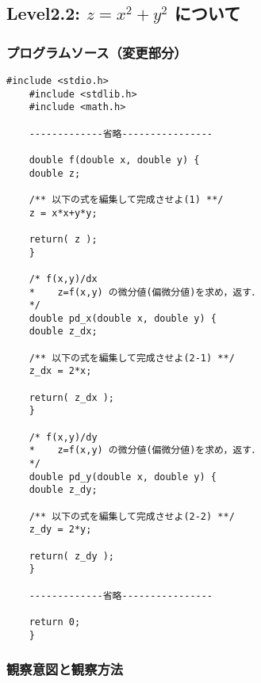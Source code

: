 \subsection{Level2.2: $z=x^2 + y^2$ について}
\subsubsection{プログラムソース（変更部分）}

	\begin{lstlisting}[caption=探索プログラム,label=ラベル]
	#include <stdio.h>
	#include <stdlib.h>
	#include <math.h>

	-------------省略----------------

	double f(double x, double y) {
  	double z;

  	/** 以下の式を編集して完成させよ(1) **/
  	z = x*x+y*y;

  	return( z );
	}

	/* f(x,y)/dx
 	*    z=f(x,y) の微分値(偏微分値)を求め，返す．
 	*/
	double pd_x(double x, double y) {
  	double z_dx;

  	/** 以下の式を編集して完成させよ(2-1) **/
  	z_dx = 2*x;

  	return( z_dx );
	}

	/* f(x,y)/dy
 	*    z=f(x,y) の微分値(偏微分値)を求め，返す．
 	*/
	double pd_y(double x, double y) {
  	double z_dy;

  	/** 以下の式を編集して完成させよ(2-2) **/
  	z_dy = 2*y;

  	return( z_dy );
	}

	-------------省略----------------

    return 0;
	}
	\end{lstlisting}

\subsubsection{観察意図と観察方法}

